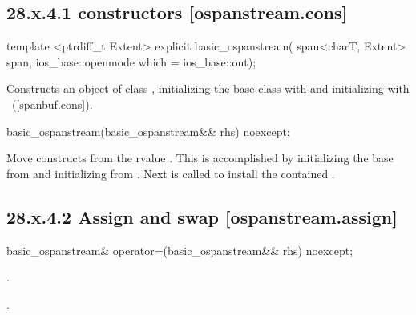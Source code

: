 \documentclass[ebook,11pt,article]{memoir}
\renewcommand{\iref}[1]{[#1]}
\begin{document}
\subsection{28.x.4.1  constructors [ospanstream.cons]}
\label{ospanstream.cons}

\begin{itemdecl}
template <ptrdiff_t Extent>
explicit basic_ospanstream(
  span<charT, Extent> span,
  ios_base::openmode which = ios_base::out);
\end{itemdecl}

\begin{itemdescr}
\pnum
\effects
Constructs an object of class
,
initializing the base class with
and initializing  with
~(\iref{spanbuf.cons}).
\end{itemdescr}

\begin{itemdecl}
basic_ospanstream(basic_ospanstream&& rhs) noexcept;
\end{itemdecl}

\begin{itemdescr}
\pnum
\effects Move constructs from the rvalue . This
is accomplished by 
initializing the base  from  
and initializing  from .
Next  is called to
install the contained .
\end{itemdescr}

\subsection{28.x.4.2 Assign and swap [ospanstream.assign]}
\label{ospanstream.assign}

\begin{itemdecl}
basic_ospanstream& operator=(basic_ospanstream&& rhs) noexcept;
\end{itemdecl}

\begin{itemdescr}
\pnum
\effects 
{} .

\pnum
\returns {}.
\end{itemdescr}
\end{document}
